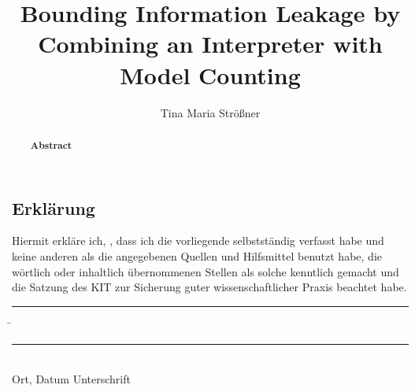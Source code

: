 \documentclass[parskip=no,12pt,a4paper,twoside,headings=openright]{scrreprt}
\title{Bounding Information Leakage by Combining an Interpreter with Model Counting}
\author{Tina Maria Strößner}
\begin{document}
\begin{otherlanguage}{ngerman} %
\mytitlepage
\end{otherlanguage}

\begin{abstract}
\begin{center}\Huge\textbf{\textsf{Abstract}}
\end{center}
\vfill
\end{abstract}

\tableofcontents













\begin{otherlanguage}{ngerman}
\chapter*{Erklärung}
\pagestyle{empty}

  \vspace{20mm}
  Hiermit erkläre ich, \theauthor, dass ich die vorliegende \thethesistype{} selbst\-ständig
verfasst habe und keine anderen als die angegebenen Quellen und Hilfsmittel
benutzt habe, die wörtlich oder inhaltlich übernommenen Stellen als solche kenntlich gemacht und
die Satzung des KIT zur Sicherung guter wissenschaftlicher Praxis beachtet habe.
  \vspace{20mm}
  \begin{tabbing}
  \rule{4cm}{.4pt}\hspace{1cm} \= \rule{7cm}{.4pt} \\
 Ort, Datum \> Unterschrift
  \end{tabbing}
\end{otherlanguage}

\pagestyle{fancy}
\appendix



\end{document}
